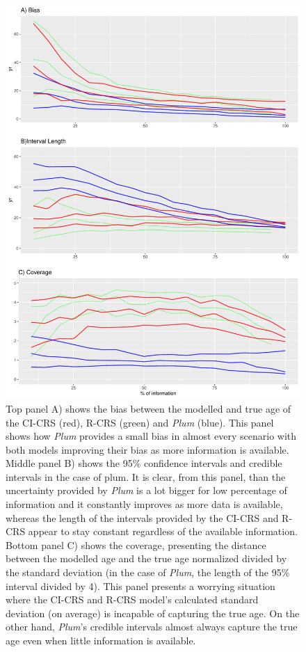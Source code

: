\documentclass [10pt] {article}
\begin{document}
\begin{figure}[!]
 \centering
  \includegraphics[width=.75\linewidth]{AccPrec.pdf}
	\caption{Top panel A) shows the bias between the modelled and true age of the CI-CRS (red), R-CRS (green) and \textit{Plum} (blue). This panel shows how \textit{Plum} provides a small bias in almost every scenario with both models improving their bias as more information is available. Middle panel B) shows the 95\% confidence intervals and credible intervals in the case of plum. It is clear, from this panel, than the uncertainty provided by \textit{Plum} is a lot bigger for low percentage of information and it constantly improves as more data is available, whereas the length of the intervals provided by the CI-CRS and R-CRS appear to stay constant regardless of the available information. Bottom panel C) shows the coverage, presenting the distance between the modelled age and the true age normalized divided by the standard deviation (in the case of \textit{Plum}, the length of the 95\% interval divided by 4). This panel presents a worrying situation where the CI-CRS and R-CRS model's calculated standard deviation (on average) is incapable of capturing the true age. On the other hand, \textit{Plum}'s credible intervals almost always capture the true age even when little information is available.}
  \label{fig:accpre}
\end{figure}
\end{document}
